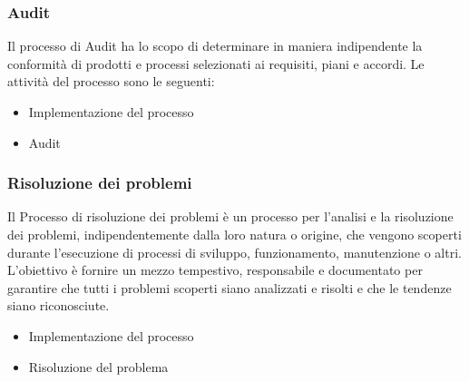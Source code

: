 \subsubsection{Audit}
Il processo di Audit ha lo scopo di determinare in maniera indipendente la conformità di prodotti e processi selezionati ai requisiti, piani e accordi.
Le attività del processo sono le seguenti:
\begin{itemize}
\item Implementazione del processo
\item Audit
\end{itemize}

\subsubsection{Risoluzione dei problemi}
Il Processo di risoluzione dei problemi è un processo per l'analisi e la risoluzione dei problemi, indipendentemente dalla loro natura o origine, che vengono scoperti durante l'esecuzione di processi di sviluppo, funzionamento, manutenzione o altri. L'obiettivo è fornire un mezzo tempestivo, responsabile e documentato per garantire che tutti i problemi scoperti siano analizzati e risolti e che le tendenze siano riconosciute.
\begin{itemize}
\item Implementazione del processo
\item Risoluzione del problema
\end{itemize}

